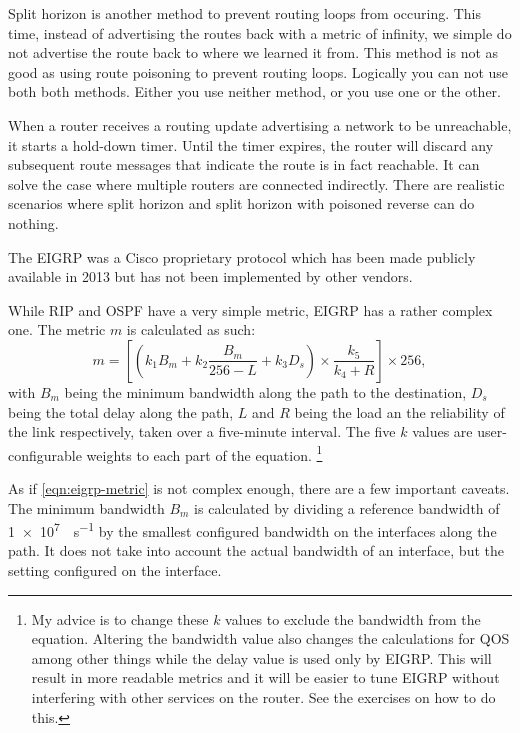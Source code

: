 Split horizon is another method to prevent routing loops from occuring.%
This time, instead of advertising the routes back with a metric of infinity, we simple do not advertise the route back to where we learned it from.
This method is not as good as using route poisoning to prevent routing loops.
Logically you can not use both both methods. Either you use neither method, or you use one or the other.

When a router receives a routing update advertising a network to be unreachable, it starts a hold-down timer.
Until the timer expires, the router will discard any subsequent route messages that indicate the route is in fact reachable.
It can solve the case where multiple routers are connected indirectly.
There are realistic scenarios where split horizon and split horizon with poisoned reverse can do nothing.%

The \acf{EIGRP} was a Cisco proprietary protocol which has been made publicly available in 2013 but has not been implemented by other vendors.

While \acs{RIP} and \acs{OSPF} have a very simple metric, \acs{EIGRP} has a rather complex one.
The metric $m$ is calculated as such:
\begin{equation}
m = \left[\left(k_1 B_m  + k_2 \frac{B_m}{256-L} + k_3 D_s\right) \times \frac{k_5}{k_4 + R}\right] \times 256,
\label{eqn:eigrp-metric}
\end{equation}
with $B_m$ being the minimum bandwidth along the path to the destination, $D_s$ being the total delay along the path, $L$ and $R$ being the load an the reliability of the link respectively, taken over a five-minute interval.
The five $k$ values are user-configurable weights to each part of the equation.%
   \footnote{%
      My advice is to change these $k$ values to exclude the bandwidth from the equation.
      Altering the bandwidth value also changes the calculations for \acs{QOS} among other things while the delay value is used only by \acs{EIGRP}.
      This will result in more readable metrics and it will be easier to tune \acs{EIGRP} without interfering with other services on the router.
      See the exercises on how to do this.
   }

As if \cref{eqn:eigrp-metric} is not complex enough, there are a few important caveats.
The minimum bandwidth $B_m$ is calculated by dividing a reference bandwidth of \SI{1e7}{\bit\per\second} by the smallest configured bandwidth on the interfaces along the path.
It does not take into account the actual bandwidth of an interface, but the setting configured on the interface.

